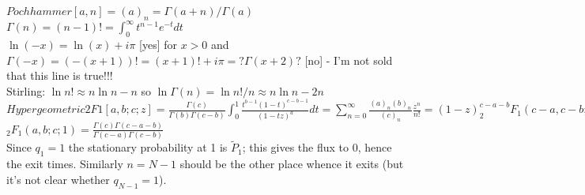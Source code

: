 $Pochhammer[a,n] = (a)_n = \Gamma(a+n)/\Gamma(a)$ \\
$\Gamma(n) = (n-1)! = \int_0^\infty t^{n-1}e^{-t}dt$ \\
$\ln(-x)=\ln(x)+i\pi$ [yes] for $x>0$ and $\Gamma(-x)=(-(x+1))!=(x+1)!+i\pi=?\Gamma(x+2)?$ [no] - I'm not sold that this line is true!!! \\
Stirling: $\ln n! \approx n \ln n - n$ so $\ln \Gamma(n) = \ln n!/n \approx n\ln n - 2n$ \\
$Hypergeometric2F1[a,b;c;z] = \frac{\Gamma(c)}{\Gamma(b)\Gamma(c-b)} \int_0^1 \frac{t^{b-1}(1-t)^{c-b-1}}{(1-t z)^{a}}dt = \sum_{n=0}^\infty \frac{(a)_n (b)_n}{(c)_n}\frac{z^n}{n!} = (1-z)^{c-a-b} _{2}F_1(c-a,c-b;c;z)$ \\
$_2F_1(a,b;c;1) = \frac{\Gamma(c)\Gamma(c-a-b)}{\Gamma(c-a)\Gamma(c-b)}$ \\
Since $q_1=1$ the stationary probability at 1 is $\widetilde{P}_1$; this gives the flux to 0, hence the exit times. 
Similarly $n=N-1$ should be the other place whence it exits (but it's not clear whether $q_{N-1}=1$). 
\fi

